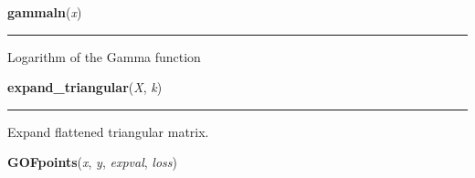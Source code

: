     \vspace{0.5ex}

    \begin{boxedminipage}{\textwidth}

    \raggedright \textbf{gammaln}(\textit{x})

    \vspace{-1.5ex}

    \rule{\textwidth}{0.5\fboxrule}

Logarithm of the Gamma function
    \vspace{1ex}

    \end{boxedminipage}

    \label{pymc:distributions:expand_triangular}

    \vspace{0.5ex}

    \begin{boxedminipage}{\textwidth}

    \raggedright \textbf{expand\_triangular}(\textit{X}, \textit{k})

    \vspace{-1.5ex}

    \rule{\textwidth}{0.5\fboxrule}

Expand flattened triangular matrix.
    \vspace{1ex}

    \end{boxedminipage}

    \label{pymc:distributions:GOFpoints}

    \vspace{0.5ex}

    \begin{boxedminipage}{\textwidth}

    \raggedright \textbf{GOFpoints}(\textit{x}, \textit{y}, \textit{expval}, \textit{loss})

    \end{boxedminipage}

    \label{pymc:distributions:rarlognormal}

    \vspace{0.5ex}

